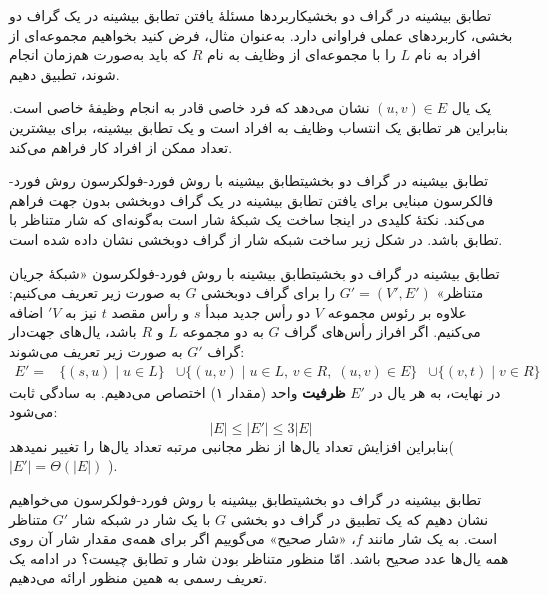 \begin{itemframe-s}{تطابق بیشینه در گراف دو بخشی}{کاربرد‌ها}
\itm
مسئلهٔ یافتن تطابق بیشینه در یک گراف دو بخشی، کاربردهای عملی فراوانی دارد.
\itm
 به‌عنوان مثال، فرض کنید بخواهیم مجموعه‌ای از افراد‌ به نام $L$ را با مجموعه‌ای از وظایف به نام $R$ که باید به‌صورت هم‌زمان انجام شوند، تطبیق دهیم.

یک یال
 $(u, v) \in E$
نشان می‌دهد که فرد خاصی قادر به انجام وظیفهٔ خاصی است.
\itm
بنابراین هر تطابق یک انتساب وظایف به افراد‌ است و یک تطابق بیشینه، برای بیشترین تعداد ممکن از افراد‌ کار فراهم می‌کند.
\end{itemframe-s}

\begin{itemframe-s}{تطابق بیشینه در گراف دو بخشی}{تطابق بیشینه با روش فورد-فولکرسون}
\itm
روش فورد-فالکرسون مبنایی برای یافتن تطابق بیشینه در یک گراف دوبخشی بدون جهت فراهم می‌کند. نکتهٔ کلیدی در اینجا ساخت یک شبکهٔ شار است به‌گونه‌ای که شار متناظر با تطابق باشد. در شکل زیر ساخت شبکه شار از گراف دوبخشی نشان داده شده است.

\end{itemframe-s}

\begin{itemframe-s}{تطابق بیشینه در گراف دو بخشی}{تطابق بیشینه با روش فورد-فولکرسون}
\itm
«شبکهٔ جریان متناظر»
 $G' = (V', E')$
را برای گراف دوبخشی $G$ به صورت زیر تعریف می‌کنیم:
علاوه بر رئوس مجموعه $V$ دو رأس جدید مبدأ $s$ و رأس مقصد $t$ نیز به $'V$ اضافه می‌کنیم.
اگر افراز رأس‌های گراف $G$ به دو مجموعه $L$ و $R$ باشد، یال‌های جهت‌دار گراف $G'$ به صورت زیر تعریف می‌شوند:
\begin{align*}
E' = & \{(s, u) \mid u \in L\}
 	  &\cup \{(u, v) \mid u \in L,\, v \in R,\; (u, v) \in E\}
	  &\cup \{(v, t) \mid v \in R\}
\end{align*}
\itm
در نهایت، به هر یال در $E'$
 \textbf{ظرفیت}
واحد (مقدار ۱) اختصاص می‌دهیم.
\itm
به سادگی ثابت می‌شود:
$$
|E| \leq |E'| \leq 3|E|
$$
بنابراین افزایش تعداد یال‌ها از نظر مجانبی مرتبه تعداد یال‌ها را تغییر نمیدهد(
$|E'| = \Theta(|E|)$
).
\end{itemframe-s}

\begin{itemframe-s}{تطابق بیشینه در گراف دو بخشی}{تطابق بیشینه با روش فورد-فولکرسون}
\itm
می‌خواهیم نشان دهیم که یک تطبیق در گراف دو بخشی $G$ با یک شار در شبکه شار $G'$ متناظر است.
\itm
به یک شار مانند $f$، «شار صحیح»
 می‌گوییم اگر برای همه‌ی مقدار شار آن روی همه یال‌ها عدد صحیح باشد.
\itm
امّا منظور متناظر بودن شار و تطابق چیست؟ در ادامه یک تعریف رسمی به همین منظور ارائه می‌دهیم.
\end{itemframe-s}

